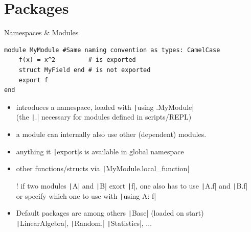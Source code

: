 \documentclass[aspectratio=169, 11pt, handout]{beamer}
\begin{document}
    \section{Packages}
    \begin{frame}[fragile]{Namespaces \& Modules}
        \begin{verbatim}
module MyModule #Same naming convention as types: CamelCase
    f(x) = x^2         # is exported
    struct MyField end # is not exported
    export f
end
        \end{verbatim}
        \begin{itemize}[<+->]
            \item introduces a namespace, loaded with \texttt|using .MyModule|
            \\\hfill{\footnotesize (the \texttt|.| necessary for modules defined in scripts/REPL)}
            \item a module can internally also use other (dependent) modules.
            \item anything it \texttt|export|s is available in \alert{global} namespace
            \item other functions/structs via \texttt|MyModule.local_function|
            \item[!] if two modules \texttt|A| and \texttt|B| exort \texttt|f|, one also has to use
            \texttt|A.f| and \texttt|B.f|
            \\ or specify which one to use with \texttt|using A: f|
            \item Default packages are among others \texttt|Base| (loaded on start)\\
            \texttt|LinearAlgebra|,
            \texttt|Random,|
            \texttt|Statistics|, ...
        \end{itemize}
    \end{frame}
\end{document}
